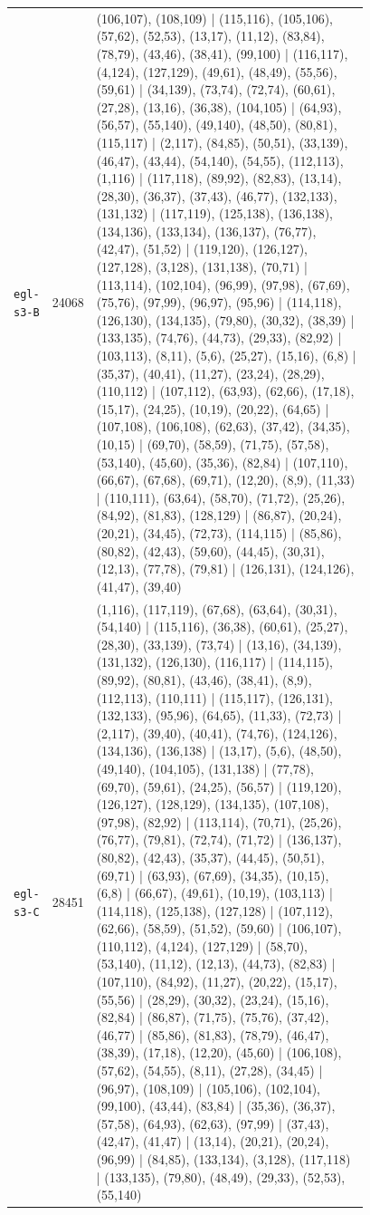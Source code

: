 \begin{landscape}
\begin{longtable}{lr>{\tiny\raggedright\arraybackslash}p{0.78\linewidth}}
\texttt{egl-s3-B} & 24068 & (106,107), (108,109) | (115,116), (105,106), (57,62), (52,53), (13,17), (11,12), (83,84), (78,79), (43,46), (38,41), (99,100) | (116,117), (4,124), (127,129), (49,61), (48,49), (55,56), (59,61) | (34,139), (73,74), (72,74), (60,61), (27,28), (13,16), (36,38), (104,105) | (64,93), (56,57), (55,140), (49,140), (48,50), (80,81), (115,117) | (2,117), (84,85), (50,51), (33,139), (46,47), (43,44), (54,140), (54,55), (112,113), (1,116) | (117,118), (89,92), (82,83), (13,14), (28,30), (36,37), (37,43), (46,77), (132,133), (131,132) | (117,119), (125,138), (136,138), (134,136), (133,134), (136,137), (76,77), (42,47), (51,52) | (119,120), (126,127), (127,128), (3,128), (131,138), (70,71) | (113,114), (102,104), (96,99), (97,98), (67,69), (75,76), (97,99), (96,97), (95,96) | (114,118), (126,130), (134,135), (79,80), (30,32), (38,39) | (133,135), (74,76), (44,73), (29,33), (82,92) | (103,113), (8,11), (5,6), (25,27), (15,16), (6,8) | (35,37), (40,41), (11,27), (23,24), (28,29), (110,112) | (107,112), (63,93), (62,66), (17,18), (15,17), (24,25), (10,19), (20,22), (64,65) | (107,108), (106,108), (62,63), (37,42), (34,35), (10,15) | (69,70), (58,59), (71,75), (57,58), (53,140), (45,60), (35,36), (82,84) | (107,110), (66,67), (67,68), (69,71), (12,20), (8,9), (11,33) | (110,111), (63,64), (58,70), (71,72), (25,26), (84,92), (81,83), (128,129) | (86,87), (20,24), (20,21), (34,45), (72,73), (114,115) | (85,86), (80,82), (42,43), (59,60), (44,45), (30,31), (12,13), (77,78), (79,81) | (126,131), (124,126), (41,47), (39,40) \\[2pt]
\texttt{egl-s3-C} & 28451 & (1,116), (117,119), (67,68), (63,64), (30,31), (54,140) | (115,116), (36,38), (60,61), (25,27), (28,30), (33,139), (73,74) | (13,16), (34,139), (131,132), (126,130), (116,117) | (114,115), (89,92), (80,81), (43,46), (38,41), (8,9), (112,113), (110,111) | (115,117), (126,131), (132,133), (95,96), (64,65), (11,33), (72,73) | (2,117), (39,40), (40,41), (74,76), (124,126), (134,136), (136,138) | (13,17), (5,6), (48,50), (49,140), (104,105), (131,138) | (77,78), (69,70), (59,61), (24,25), (56,57) | (119,120), (126,127), (128,129), (134,135), (107,108), (97,98), (82,92) | (113,114), (70,71), (25,26), (76,77), (79,81), (72,74), (71,72) | (136,137), (80,82), (42,43), (35,37), (44,45), (50,51), (69,71) | (63,93), (67,69), (34,35), (10,15), (6,8) | (66,67), (49,61), (10,19), (103,113) | (114,118), (125,138), (127,128) | (107,112), (62,66), (58,59), (51,52), (59,60) | (106,107), (110,112), (4,124), (127,129) | (58,70), (53,140), (11,12), (12,13), (44,73), (82,83) | (107,110), (84,92), (11,27), (20,22), (15,17), (55,56) | (28,29), (30,32), (23,24), (15,16), (82,84) | (86,87), (71,75), (75,76), (37,42), (46,77) | (85,86), (81,83), (78,79), (46,47), (38,39), (17,18), (12,20), (45,60) | (106,108), (57,62), (54,55), (8,11), (27,28), (34,45) | (96,97), (108,109) | (105,106), (102,104), (99,100), (43,44), (83,84) | (35,36), (36,37), (57,58), (64,93), (62,63), (97,99) | (37,43), (42,47), (41,47) | (13,14), (20,21), (20,24), (96,99) | (84,85), (133,134), (3,128), (117,118) | (133,135), (79,80), (48,49), (29,33), (52,53), (55,140) \\[2pt]

\end{longtable}
\end{landscape}
